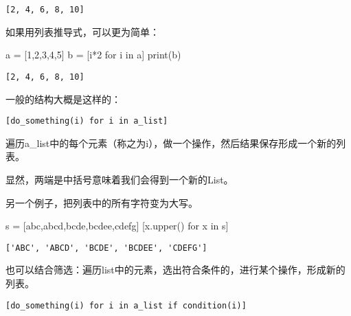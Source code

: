 \documentclass[
  letterpaper,
  DIV=11,
  numbers=noendperiod]{scrreprt}
\newenvironment{Shaded}{\begin{snugshade}}{\end{snugshade}}
\newcommand{\BuiltInTok}[1]{\textcolor[rgb]{0.00,0.23,0.31}{#1}}
\newcommand{\ControlFlowTok}[1]{\textcolor[rgb]{0.00,0.23,0.31}{#1}}
\newcommand{\DecValTok}[1]{\textcolor[rgb]{0.68,0.00,0.00}{#1}}
\newcommand{\KeywordTok}[1]{\textcolor[rgb]{0.00,0.23,0.31}{#1}}
\newcommand{\NormalTok}[1]{\textcolor[rgb]{0.00,0.23,0.31}{#1}}
\newcommand{\OperatorTok}[1]{\textcolor[rgb]{0.37,0.37,0.37}{#1}}
\newcommand{\StringTok}[1]{\textcolor[rgb]{0.13,0.47,0.30}{#1}}
\begin{document}
\begin{verbatim}
[2, 4, 6, 8, 10]
\end{verbatim}

如果用列表推导式，可以更为简单：

\begin{Shaded}
\begin{Highlighting}[]
\NormalTok{a }\OperatorTok{=}\NormalTok{ [}\DecValTok{1}\NormalTok{,}\DecValTok{2}\NormalTok{,}\DecValTok{3}\NormalTok{,}\DecValTok{4}\NormalTok{,}\DecValTok{5}\NormalTok{]}
\NormalTok{b }\OperatorTok{=}\NormalTok{ [i}\OperatorTok{*}\DecValTok{2} \ControlFlowTok{for}\NormalTok{ i }\KeywordTok{in}\NormalTok{ a]}
\BuiltInTok{print}\NormalTok{(b)}
\end{Highlighting}
\end{Shaded}

\begin{verbatim}
[2, 4, 6, 8, 10]
\end{verbatim}

一般的结构大概是这样的：

\texttt{{[}do\_something(i)\ for\ i\ in\ a\_list{]}}

遍历a\_list中的每个元素（称之为i），做一个操作，然后结果保存形成一个新的列表。

显然，两端是中括号意味着我们会得到一个新的List。

另一个例子，把列表中的所有字符变为大写。

\begin{Shaded}
\begin{Highlighting}[]
\NormalTok{s }\OperatorTok{=}\NormalTok{ [}\StringTok{\textquotesingle{}abc\textquotesingle{}}\NormalTok{,}\StringTok{\textquotesingle{}abcd\textquotesingle{}}\NormalTok{,}\StringTok{\textquotesingle{}bcde\textquotesingle{}}\NormalTok{,}\StringTok{\textquotesingle{}bcdee\textquotesingle{}}\NormalTok{,}\StringTok{\textquotesingle{}cdefg\textquotesingle{}}\NormalTok{]}
\NormalTok{[x.upper() }\ControlFlowTok{for}\NormalTok{ x }\KeywordTok{in}\NormalTok{ s]}
\end{Highlighting}
\end{Shaded}

\begin{verbatim}
['ABC', 'ABCD', 'BCDE', 'BCDEE', 'CDEFG']
\end{verbatim}

也可以结合筛选：遍历list中的元素，选出符合条件的，进行某个操作，形成新的列表。

\texttt{{[}do\_something(i)\ for\ i\ in\ a\_list\ if\ condition(i){]}}
\end{document}

